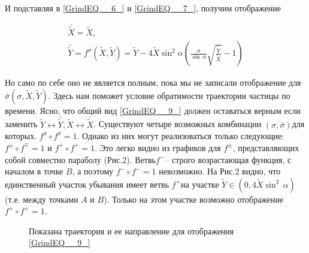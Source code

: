 \documentclass[a4paper]{article}
\begin{document}
И подставляя в \eqref{GrindEQ__6_} и \eqref{GrindEQ__7_}, получим отображение

\begin{equation} \label{GrindEQ__9_} \begin{array}{l} {\bar{\tilde{X}}=\tilde{X},} \\ {\bar{\tilde{Y}}=f^{\sigma } \left(\tilde{X},\tilde{Y}\right)=\tilde{Y}-4\tilde{X}\sin ^{2} \alpha \left(\frac{\sigma }{\sin \, \alpha } \sqrt{\frac{\tilde{Y}}{\tilde{X}} } -1\right)} \end{array} \end{equation}

Но само по себе оно не является полным, пока мы не записали отображение для  $\bar{\sigma }\left(\sigma ,\tilde{X},\tilde{Y}\right)$. Здесь нам поможет условие обратимости траектории частицы по времени. Ясно, что общий вид \eqref{GrindEQ__9_} должен оставаться верным если заменить $\tilde{Y}\leftrightarrow \bar{\tilde{Y}},\tilde{X}\leftrightarrow \bar{\tilde{X}}$. Существуют четыре возможных комбинации $\left(\sigma ,\bar{\sigma }\right)$для которых. $f^{\sigma } \circ f^{\bar{\sigma }} =1$. Однако из них могут реализоваться только следующие: $f^{\pm } \circ f^{\mp } =1$ и $f^{+} \circ f^{+} =1$. Это легко видно из графиков для $f^{\pm } $, представляющих собой совместно параболу (Рис.2). Ветвь$f^{-} $-- строго возрастающая функция, с началом в точке $B$, а поэтому $f^{-} \circ f^{-} =1$ невозможно. На Рис.2 видно, что единственный участок убывания имеет ветвь $f^{+} $на участке $\tilde{Y}\in \left(0,4\tilde{X}\sin ^{2} \, \alpha \right)$(т.е. между точками $A$ и $B$). Только на этом участке возможно отображение $f^{+} \circ f^{+} =1$.


\begin{figure}[h]
\caption{ Показана траектория и ее направление для отображения \eqref{GrindEQ__9_} }
\label{image8}
\end{figure}
\end{document}
